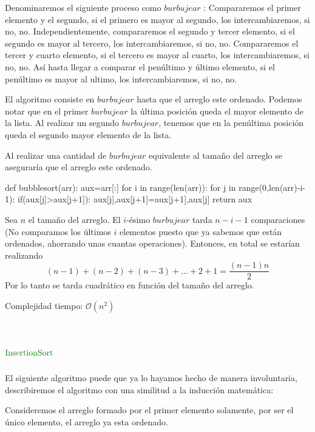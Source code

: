 \documentclass[12pt,a4paper]{article}
\begin{document}
Denominaremos el siguiente proceso como $burbujear$  : Compararemos el primer elemento y el segundo, si el primero es mayor al segundo, los intercambiaremos, si no, no. Independientemente, compararemos el segundo y tercer elemento, si el segundo es mayor al tercero, los intercambiaremos, si no, no. Compararemos el tercer y cuarto elemento, si el tercero es mayor al cuarto, los intercambiaremos, si no, no. As\'i hasta llegar a comparar el pen\'ultimo y \'ultimo elemento, si el pen\'ultimo es mayor al ultimo, los intercambiaremos, si no, no.

El algoritmo consiste en $burbujear$  hasta que el arreglo este ordenado. Podemos notar que en el primer $burbujear$    la \'ultima posici\'on queda el mayor elemento de la lista. Al realizar un segundo $burbujear$, tenemos que en la pen\'ultima posici\'on queda el segundo mayor elemento de la lista. 

Al realizar una cantidad de $burbujear$ equivalente al tama\~no del arreglo se asegurar\'ia que el arreglo este ordenado.  

\begin{python}
def bubblesort(arr):
    aux=arr[:]
    for i in range(len(arr)):
        for j in range(0,len(arr)-i-1):
            if(aux[j]>aux[j+1]):
                aux[j],aux[j+1]=aux[j+1],aux[j]
    return aux
\end{python}

Sea $n$ el tama\~no del arreglo. El $i$-\'esimo $burbujear$ tarda $n-i-1$ comparaciones (No comparamos los \'ultimos $i$ elementos puesto que ya sabemos que est\'an ordenados, ahorrando unas cuantas operaciones). Entonces, en total se estar\'ian realizando $$(n-1)+(n-2)+(n-3)+\dots+2+1= \frac{(n-1)n}{2}$$
Por lo tanto se tarda cuadr\'atico en funci\'on del tama\~no del arreglo.  
\newline

Complejidad tiempo: $\mathcal{O}(n^2)$

\section{$\textcolor{deepgreen}{\mathrm{Insertion Sort}}$}
El siguiente algoritmo puede que ya lo hayamos hecho de manera involuntaria, describiremos el algoritmo con una similitud a la inducci\'on matem\'atica:
\newline


Consideremos el arreglo formado por el primer elemento solamente, por ser el \'unico elemento, el arreglo ya esta ordenado. 
\end{document}
